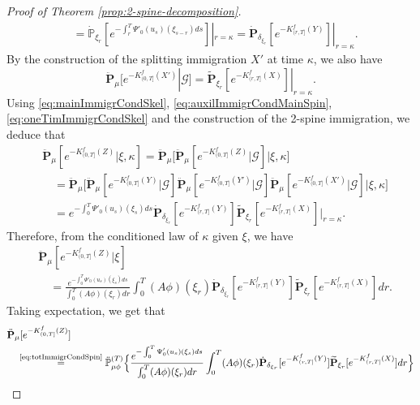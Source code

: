 \begin{proof}[Proof of Theorem \ref{prop:2-spine-decomposition}]
\begin{equation}
\begin{split}
	&= \dot{\mathbb P}_{\xi_r}[e^{-\int_r^T\Psi'_0(u_s)(\xi_{s-r})ds}]|_{r=\kappa}
	= \dot{\mathbf P}_{\delta_{\xi_r}} [e^{-K^f_{(r, T]}(Y)}]|_{r=\kappa}.
\end{split}\end{equation}
	By the construction of the splitting immigration $X'$ at time $\kappa$, we also have
\begin{equation}\label{eq:oneTimImmigrCondSkel}
    \ddot {\mathbf P}_\mu[e^{-K^f_{(0, T]}(X')}|\mathscr G ]
	= \widetilde{\mathbf P}_{\xi_r}[e^{-K^f_{(r, T]}(X)}]|_{r=\kappa}.
\end{equation}
	Using \eqref{eq:mainImmigrCondSkel}, \eqref{eq:auxilImmigrCondMainSpin}, \eqref{eq:oneTimImmigrCondSkel} and the construction of the 2-spine immigration, we deduce that
\[\begin{split}
	&\ddot {\mathbf P}_\mu[e^{-K^f_{(0, T]}(Z)}|\xi,\kappa]
	=\ddot {\mathbf P}_\mu\big[ \ddot {\mathbf P}_\mu[e^{-K^f_{(0, T]}(Z)}|\mathscr G ] \big | \xi,\kappa\big]\\
	&\quad=\ddot {\mathbf P}_\mu\Big[ \ddot {\mathbf P}_\mu[e^{-K^f_{(0, T]}(Y)}|\mathscr G ] \ddot {\mathbf P}_\mu[e^{-K^f_{(0, T]}(Y')}|\mathscr G ] \ddot {\mathbf P}_\mu[e^{-K^f_{(0, T]}(X')}|\mathscr G ] \Big | \xi,\kappa\Big]\\
	&\quad=e^{-\int_0^T\Psi'_0(u_s)(\xi_s)ds}\dot {\mathbf P}_{\delta_{\xi_r}}[ e^{-K^f_{(r, T]}(Y)}]\widetilde{\mathbf P}_{\xi_r}[e^{-K^f_{(r, T]}(X)}]\big |_{r=\kappa}.
\end{split}\]
	Therefore, from the conditioned law of $\kappa$ given $\xi$, we have
\begin{equation}\label{eq:totImmigrCondSpin}\begin{split}
	&\ddot {\mathbf P}_\mu[e^{-K^f_{(0, T]}(Z)}|\xi]\\
	&\quad = \frac{e^{-\int_0^T\Psi'_0(u_s)(\xi_s)ds}}{\int_0^T (A\phi)(\xi_r)dr}\int_0^T  (A\phi)(\xi_r)\dot {\mathbf P}_{\delta_{\xi_r}}[ e^{-K^f_{(r, T]}(Y)}]\widetilde{\mathbf P}_{\xi_r}[e^{-K^f_{(r, T]}(X)}] dr.
\end{split}\end{equation}
	Taking expectation, we get that
\[\begin{split}
	&\ddot {\mathbf P}_\mu[e^{-K^f_{(0,T]}(Z)}]\\
	&\quad \overset{\text{\eqref{eq:totImmigrCondSpin}}}{=}\ddot {\mathbb P}_{\mu\phi}^{(T)}\Big\{ \frac{e^{-\int_0^T\Psi'_0(u_s)(\xi_s)ds}}{\int_0^T (A\phi)(\xi_r)dr}\int_0^T  (A\phi)(\xi_r)\dot {\mathbf P}_{\delta_{\xi_r}}[ e^{-K^f_{(r, T]}(Y)}]\widetilde{\mathbf P}_{\xi_r}[e^{-K^f_{(r, T]}(X)}] dr\Big\}\\

\end{split}\]
\end{proof}
